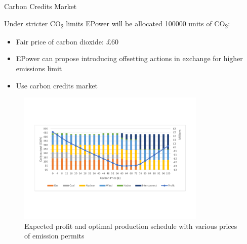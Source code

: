\documentclass{beamer}
\begin{document}
  \begin{frame}{Carbon Credits Market}
  
      Under stricter CO\textsubscript{2} limits EPower will be allocated 100000 units of CO\textsubscript{2}:
      \small
        \begin{itemize}
            \item Fair price of carbon dioxide: £60

            \item EPower can propose introducing offsetting actions in exchange for higher emissions limit 
            \item Use carbon credits market
        \end{itemize}      
    
        
        \begin{figure}
        \centering
        	\includegraphics[width=0.8\textwidth]{Graphs/carbon_credit.pdf}
            \small
\caption{Expected profit and optimal production schedule with various prices of emission permits}
        \end{figure}
               
        
    \end{frame}
        
    
\end{document}

